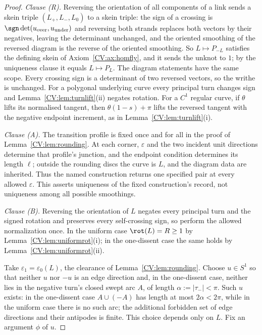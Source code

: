 \begin{proof}\leanok{}
\emph{Clause (R).}
Reversing the orientation of all components of a link sends a skein triple
$(L_+,L_-,L_0)$ to a skein triple: the sign of a crossing is
$\sgn\det(u_{\mathrm{over}},u_{\mathrm{under}})$ and reversing both strands
replaces both vectors by their negatives, leaving the determinant unchanged, and
the oriented smoothing of the reversed diagram is the reverse of the oriented
smoothing. So $L\mapsto P_{-L}$ satisfies the defining skein of
Axiom~\ref{CV:ax:homfly}, and it sends the unknot to $1$; by the uniqueness clause
it equals $L\mapsto P_L$. The diagram statements have the same scope. Every crossing sign is a
determinant of two reversed vectors, so the writhe is unchanged. For a
polygonal underlying curve every principal turn changes sign and
Lemma~\ref{CV:lem:turnlift}(ii) negates rotation. For a $C^1$ regular curve,
if $\theta$ lifts its normalised tangent, then $\theta(1-s)+\pi$ lifts the
reversed tangent with the negative endpoint increment, as in
Lemma~\ref{CV:lem:turnlift}(i).

\emph{Clause (A).} The transition profile is fixed once and for all in the proof of
Lemma~\ref{CV:lem:rounding}.  At each corner, $\varepsilon$ and the two incident
unit directions determine that profile's junction, and the endpoint condition
determines its length $\ell$; outside the rounding discs the curve is $L$, and
the diagram data are inherited.  Thus the named construction returns one
specified pair at every allowed $\varepsilon$.  This asserts uniqueness of the
fixed construction's record, not uniqueness among all possible smoothings.

\emph{Clause (B).}
Reversing the orientation of $L$ negates every principal turn and the signed rotation and
preserves every self-crossing sign, so perform the allowed normalization once. In the
uniform case $\rot(L)=R\geq1$ by Lemma~\ref{CV:lem:uniformrot}(i); in the one-dissent case the same holds by Lemma~\ref{CV:lem:uniformrot}(ii).

Take $\varepsilon_1=\varepsilon_0(L)$, the clearance of Lemma~\ref{CV:lem:rounding}.
Choose $u\in S^1$ so that neither $u$ nor $-u$ is an edge direction and, in the
one-dissent case, neither lies in the negative turn's closed swept arc $A$, of
length $\alpha:=|\tau_-|<\pi$. Such $u$ exists: in the one-dissent case $A\cup(-A)$
has length at most $2\alpha<2\pi$, while in the uniform case there is no such arc; the additional
forbidden set of edge directions and their antipodes is finite. This choice depends only on $L$. Fix an argument $\phi$ of $u$.


\end{proof}
